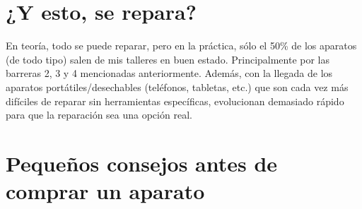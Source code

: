 \section{¿Y esto, se repara?}
En teoría, todo se puede reparar, pero en la práctica, sólo el 50\% de los aparatos (de todo tipo) salen de mis talleres en buen estado.
Principalmente por las barreras 2, 3 y 4 mencionadas anteriormente.
Además, con la llegada de los aparatos portátiles/desechables (teléfonos, tabletas, etc.)
que son cada vez más difíciles de reparar sin herramientas específicas, evolucionan demasiado rápido
para que la reparación sea una opción real.

\section{Pequeños consejos antes de comprar un aparato}
